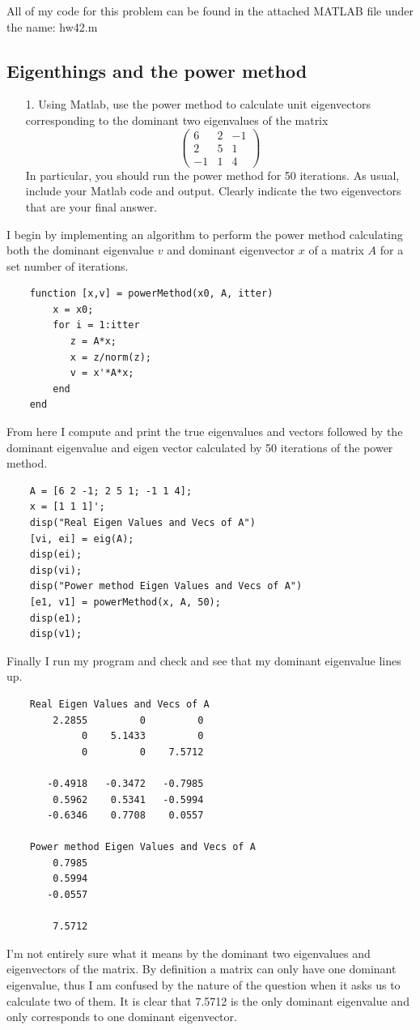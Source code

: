 \documentclass{article}
\begin{document}
All of my code for this problem can be found in the attached MATLAB file under the name: hw42.m

\newpage
\subsection{Eigenthings and the power method}
\begin{itemize}
    \item[1.] Using Matlab, use the power method to calculate unit eigenvectors corresponding to the dominant two eigenvalues of the matrix
    \[\begin{pmatrix} 6 & 2 & -1 \\ 2 & 5 & 1 \\ -1 & 1 & 4 \end{pmatrix}\]
    In particular, you should run the power method for 50 iterations. As usual, include your Matlab code and output. Clearly indicate the two eigenvectors that are your final answer.
\end{itemize}
I begin by implementing an algorithm to perform the power method calculating both the dominant eigenvalue $v$ and dominant eigenvector $x$ of a matrix $A$ for a set number of iterations. 
\begin{verbatim}
    function [x,v] = powerMethod(x0, A, itter)
        x = x0;
        for i = 1:itter
           z = A*x;
           x = z/norm(z);
           v = x'*A*x;
        end
    end
\end{verbatim}
From here I compute and print the true eigenvalues and vectors followed by the dominant eigenvalue and eigen vector calculated by 50 iterations of the power method.
\begin{verbatim}
    A = [6 2 -1; 2 5 1; -1 1 4];
    x = [1 1 1]';
    disp("Real Eigen Values and Vecs of A")
    [vi, ei] = eig(A);
    disp(ei);
    disp(vi);
    disp("Power method Eigen Values and Vecs of A")
    [e1, v1] = powerMethod(x, A, 50);
    disp(e1);
    disp(v1);
\end{verbatim}

\newpage
Finally I run my program and check and see that my dominant eigenvalue lines up.
\begin{verbatim}
    Real Eigen Values and Vecs of A
        2.2855         0         0
             0    5.1433         0
             0         0    7.5712
    
       -0.4918   -0.3472   -0.7985
        0.5962    0.5341   -0.5994
       -0.6346    0.7708    0.0557

    Power method Eigen Values and Vecs of A
        0.7985
        0.5994
       -0.0557
    
        7.5712
\end{verbatim}
I'm not entirely sure what it means by the dominant two eigenvalues and eigenvectors of the matrix. By definition a matrix can only have one dominant eigenvalue, thus I am confused by the nature of the question when it asks us to calculate two of them. It is clear that 7.5712 is the only dominant eigenvalue and only corresponds to one dominant eigenvector.  
\end{document}
